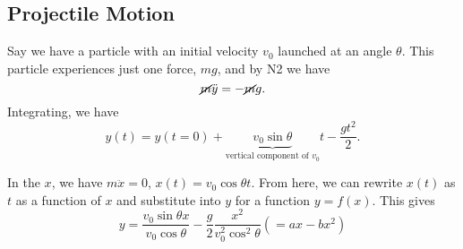 \documentclass[12pt]{article}
\begin{document}
\subsection{Projectile Motion}
Say we have a particle with an initial velocity $v_0$ launched at an angle $\theta$. This particle experiences just one force, $mg$, and by N2 we have \[\cancel{m} \ddot{y} = -\cancel{m}g.\] Integrating, we have \[y(t) = y(t=0) + \underbrace{v_0 \sin \theta}_{\text{vertical component of $v_0$}} t - \frac{g t^2}{2}.\]

In the $x$, we have $m \ddot{x} = 0$, $x(t) = v_0 \cos \theta t$. From here, we can rewrite $x(t)$ as $t$ as a function of $x$ and substitute into $y$ for a function $y = f(x)$. This gives \[
y = \frac{v_0 \sin \theta x}{v_0 \cos \theta} - \frac{g}{2} \frac{x^2}{v_0^2 \cos^2 \theta} (= ax - bx^2)  
\]
\end{document}
